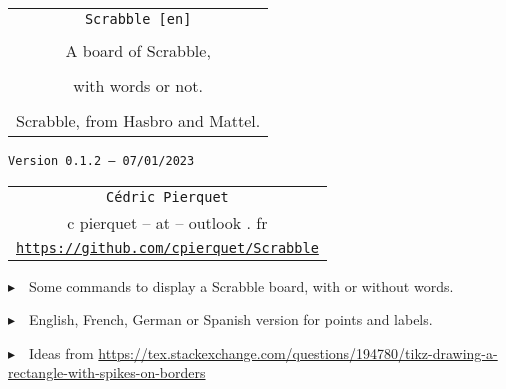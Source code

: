 \documentclass{article}
\def\TPversion{0.1.2}
\def\TPdate{07/01/2023}
\begin{document}
\pagestyle{fancy}

\thispagestyle{empty}

\vspace{2cm}

\begin{center}
	\begin{minipage}{0.75\linewidth}
	\begin{tcolorbox}[colframe=yellow,colback=yellow!15]
		\begin{center}
			\begin{tabular}{c}
				{\Huge \texttt{Scrabble [en]}}\\
				\\
				{\LARGE A board of Scrabble,} \\
				\\
				{\LARGE with words or not.} \\
				\\
				{Scrabble\texttrademark{}, from Hasbro\texttrademark{} and Mattel\texttrademark{}.}
			\end{tabular}
			
			\medskip
			
			{\small \texttt{Version \TPversion{} -- \TPdate}}
		\end{center}
	\end{tcolorbox}
\end{minipage}
\end{center}

\vspace{0.5cm}

\begin{center}
	\begin{tabular}{c}
	\texttt{Cédric Pierquet}\\
	{\ttfamily c pierquet -- at -- outlook . fr}\\
	\texttt{\url{https://github.com/cpierquet/Scrabble}}
\end{tabular}
\end{center}

\vspace{0.5cm}

{$\blacktriangleright$~~Some commands to display a Scrabble board, with or without words.}

\smallskip

{$\blacktriangleright$~~English, French, German or Spanish version for points and labels.}

\smallskip

{$\blacktriangleright$~~Ideas from \url{https://tex.stackexchange.com/questions/194780/tikz-drawing-a-rectangle-with-spikes-on-borders}}
\end{document}
